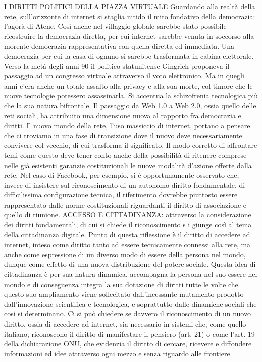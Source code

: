 I DIRITTI POLITICI DELLA PIAZZA VIRTUALE
Guardando alla realtà della rete, sull’orizzonte di internet si staglia nitido il mito fondativo della democrazia: l’agorà di Atene. Così anche nel villaggio globale sarebbe stato possibile ricostruire la democrazia diretta, per cui internet sarebbe venuta in soccorso alla morente democrazia rappresentativa con quella diretta ed immediata. Una democrazia per cui la casa di ognuno si sarebbe trasformata in cabina elettorale. Verso la metà degli anni 90 il politico statunitense Gingrich proponeva il passaggio ad un congresso virtuale attraverso il voto elettronico. Ma in quegli anni c’era anche un totale assalto alla privacy e alla sua morte, col timore che le nuove tecnologie potessero assassinarla. Si accentua la schizofrenia tecnologica più che la sua natura bifrontale. 
Il passaggio da Web 1.0 a Web 2.0, ossia quello delle reti sociali, ha attribuito una dimensione nuova al rapporto fra democrazia e diritti. Il nuovo mondo della rete, l’uso massiccio di internet, portano a pensare che ci troviamo in una fase di transizione dove il nuovo deve necessariamente convivere col vecchio, di cui trasforma il significato.
Il modo corretto di affrontare temi come questo deve tener conto anche della possibilità di ritenere comprese nelle già esistenti garanzie costituzionali le nuove modalità d’azione offerte dalla rete. Nel caso di Facebook, per esempio, si è opportunamente osservato che, invece di insistere sul riconoscimento di un autonomo diritto fondamentale, di difficilissima configurazione tecnica, il riferimento dovrebbe piuttosto essere rappresentato dalle norme costituzionali riguardanti il diritto di associazione e quello di riunione.
ACCESSO E CITTADINANZA:
attraverso  la considerazione dei diritti fondamentali, di cui si chiede il riconoscimento s i giunge così al tema della cittadinanza digitale. Punto di questa riflessione è il diritto di accedere ad internet, inteso come diritto tanto ad essere tecnicamente connessi alla rete, ma anche come espressione di un diverso modo di essere della persona nel mondo, dunque come effetto di una nuova distribuzione del potere sociale.
Questa idea di cittadinanza è per sua natura dinamica, accompagna la persona nel suo essere nel mondo e di conseguenza integra la sua dotazione di diritti tutte le volte che questo suo ampliamento viene sollecitato dall’incessante mutamento prodotto dall’innovazione scientifica e tecnologica, e soprattutto dalle dinamiche sociali che così si determinano. Ci si può chiedere se davvero il riconoscimento di un nuovo diritto, ossia di accedere ad internet, sia necessario in sistemi che, come quello italiano, riconoscono il diritto di manifestare il pensiero (art. 21) o come l’art. 19 della dichiarazione ONU, che evidenzia il diritto di cercare, ricevere e diffondere informazioni ed idee attraverso ogni mezzo e senza riguardo alle frontiere.
